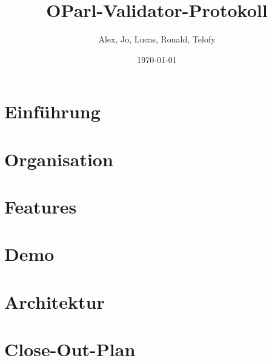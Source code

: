 \documentclass[12pt, fleqn]{scrartcl}
\title{OParl-Validator-Protokoll}
\author{Alex, Jo, Lucas, Ronald, Telofy}
\date{\today}
\begin{document}
\Maketitle

\section{Einführung}
\section{Organisation}
\section{Features}
\section{Demo}
\section{Architektur}
\section{Close-Out-Plan}


{}
\setlength\bibitemsep{0pt}
\printbibliography
\end{document}
